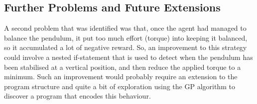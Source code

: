 \subsection{Further Problems and Future Extensions}
A second problem that was identified was that, once the agent had managed to balance the pendulum, it put too much effort (torque) into keeping it balanced, so it accumulated a lot of negative reward. So, an improvement to this strategy could involve a nested if-statement that is used to detect when the pendulum has been stabilised at a vertical position, and then reduce the applied torque to a minimum. Such an improvement would probably require an extension to the program structure and quite a bit of exploration using the GP algorithm to discover a program that encodes this behaviour. 
